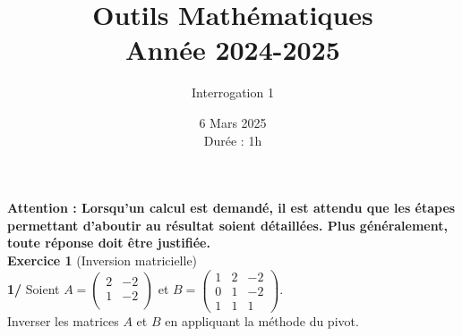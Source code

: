\documentclass[a4paper,12pt]{article}
\title{Outils Mathématiques \\
Année 2024-2025}
\author{Interrogation 1}
\date{6 Mars 2025 \\
Durée : 1h}
\begin{document}
\maketitle

\textbf{Attention : Lorsqu'un calcul est demandé, il est attendu que les étapes permettant d'aboutir au résultat soient détaillées. Plus généralement, toute réponse doit être justifiée.} \\


\textbf{Exercice 1} (Inversion matricielle) \\

\textbf{1/} Soient \( A = \begin{pmatrix}
2 & -2 \\
1 & -2 \\
\end{pmatrix} \) et \( B = \begin{pmatrix}
1 & 2 & -2 \\
0 & 1 & -2 \\
1 & 1 & 1
\end{pmatrix} \). \\

Inverser les matrices $A$ et $B$ en appliquant la méthode du pivot. \\
\end{document}
